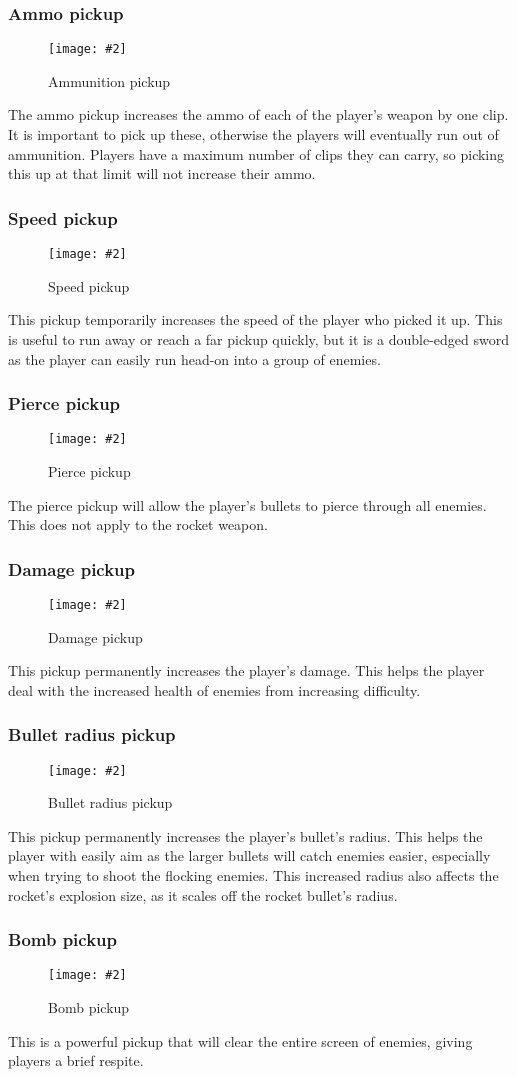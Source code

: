 \documentclass{article}
\newcommand{\figimg}[3]{
  \begin{figure}[H]
    \centering
    \texttt{[image: \#2]}
    \caption{#3}
  \end{figure}
  \noindent 
}
\begin{document}
\subsubsection{Ammo pickup}
\figimg{0.1}{imgs/AmmoPickup.png}{Ammunition pickup}
The ammo pickup increases the ammo of each of the player's weapon by one clip. It is important to pick up these, otherwise the players will eventually run out of ammunition. Players have a maximum number of clips they can carry, so picking this up at that limit will not increase their ammo.

\subsubsection{Speed pickup}
\figimg{0.1}{imgs/SpeedPickup.png}{Speed pickup}
This pickup temporarily increases the speed of the player who picked it up. This is useful to run away or reach a far pickup quickly, but it is a double-edged sword as the player can easily run head-on into a group of enemies.

\subsubsection{Pierce pickup}
\figimg{0.1}{imgs/PiercePickup.png}{Pierce pickup}
The pierce pickup will allow the player's bullets to pierce through all enemies. This does not apply to the rocket weapon.

\subsubsection{Damage pickup}
\figimg{0.1}{imgs/DamagePickup.png}{Damage pickup}
This pickup permanently increases the player's damage. This helps the player deal with the increased health of enemies from increasing difficulty.

\subsubsection{Bullet radius pickup}
\figimg{0.1}{imgs/RadiusPickup.png}{Bullet radius pickup}
This pickup permanently increases the player's bullet's radius. This helps the player with easily aim as the larger bullets will catch enemies easier, especially when trying to shoot the flocking enemies. This increased radius also affects the rocket's explosion size, as it scales off the rocket bullet's radius.

\subsubsection{Bomb pickup}
\figimg{0.1}{imgs/BombPickup.png}{Bomb pickup}
This is a powerful pickup that will clear the entire screen of enemies, giving players a brief respite. 
\end{document}
